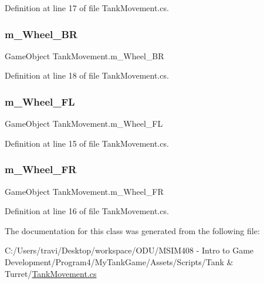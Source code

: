 Definition at line 17 of file Tank\+Movement.\+cs.

\mbox{\label{class_tank_movement_a2502e9dc69516fb41e8781563c2d1cbe}} 
\subsubsection{\texorpdfstring{m\+\_\+\+Wheel\+\_\+\+BR}{m\_Wheel\_BR}}
{\footnotesize\ttfamily Game\+Object Tank\+Movement.\+m\+\_\+\+Wheel\+\_\+\+BR}



Definition at line 18 of file Tank\+Movement.\+cs.

\mbox{\label{class_tank_movement_ad429eeb7e51260ede34edd1497a5e746}} 
\subsubsection{\texorpdfstring{m\+\_\+\+Wheel\+\_\+\+FL}{m\_Wheel\_FL}}
{\footnotesize\ttfamily Game\+Object Tank\+Movement.\+m\+\_\+\+Wheel\+\_\+\+FL}



Definition at line 15 of file Tank\+Movement.\+cs.

\mbox{\label{class_tank_movement_ac1530da9ca85a2fc03ad0e157779b277}} 
\subsubsection{\texorpdfstring{m\+\_\+\+Wheel\+\_\+\+FR}{m\_Wheel\_FR}}
{\footnotesize\ttfamily Game\+Object Tank\+Movement.\+m\+\_\+\+Wheel\+\_\+\+FR}



Definition at line 16 of file Tank\+Movement.\+cs.



The documentation for this class was generated from the following file\+:\begin{DoxyCompactItemize}
\item 
C\+:/\+Users/travi/\+Desktop/workspace/\+O\+D\+U/\+M\+S\+I\+M408 -\/ Intro to Game Development/\+Program4/\+My\+Tank\+Game/\+Assets/\+Scripts/\+Tank \& Turret/\hyperlink{_tank_movement_8cs}{Tank\+Movement.\+cs}\end{DoxyCompactItemize}
